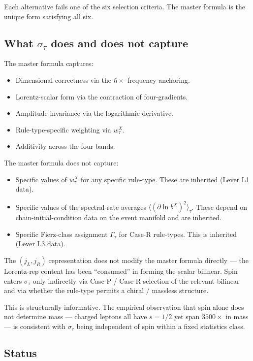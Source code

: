 \documentclass[11pt,a4paper]{article}
\begin{document}
Each alternative fails one of the six selection criteria. The master formula is the unique form satisfying all six.

\subsection{What $\sigma_\tau$ does and does not capture}

The master formula captures:

\begin{itemize}[noitemsep]
  \item Dimensional correctness via the $\hbar \times$ frequency anchoring.
  \item Lorentz-scalar form via the contraction of four-gradients.
  \item Amplitude-invariance via the logarithmic derivative.
  \item Rule-type-specific weighting via $w_\tau^X$.
  \item Additivity across the four bands.
\end{itemize}

The master formula does not capture:

\begin{itemize}[noitemsep]
  \item Specific values of $w_\tau^X$ for any specific rule-type. These are inherited (Lever L1 data).
  \item Specific values of the spectral-rate averages $\langle(\partial\ln b^X)^2\rangle_\tau$. These depend on chain-initial-condition data on the event manifold and are inherited.
  \item Specific Fierz-class assignment $\Gamma_\tau$ for Case-R rule-types. This is inherited (Lever L3 data).
\end{itemize}

The $(j_L, j_R)$ representation does not modify the master formula directly --- the Lorentz-rep content has been ``consumed'' in forming the scalar bilinear. Spin enters $\sigma_\tau$ only indirectly via Case-P / Case-R selection of the relevant bilinear and via whether the rule-type permits a chiral / massless structure.

This is structurally informative. The empirical observation that spin alone does not determine mass --- charged leptons all have $s = 1/2$ yet span $3500\times$ in mass --- is consistent with $\sigma_\tau$ being independent of spin within a fixed statistics class.

\subsection{Status}
\end{document}
